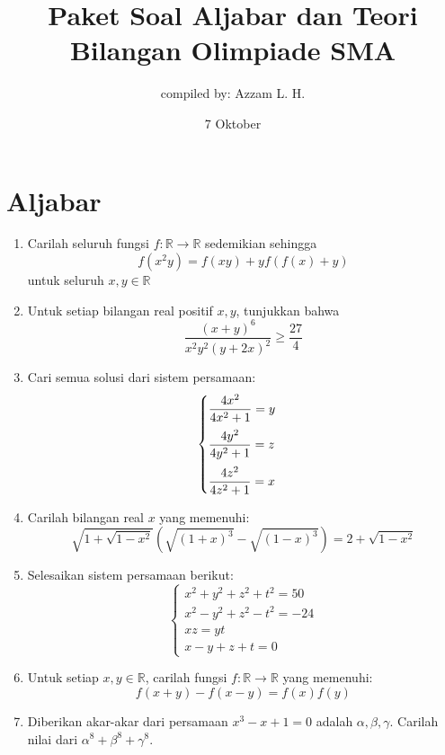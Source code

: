 \documentclass[12pt]{scrartcl}
\title{Paket Soal Aljabar dan Teori Bilangan Olimpiade SMA}
\author{compiled by: Azzam L. H.}
\date{7 Oktober}
\newcommand{\R}{\mathbb{R}}
\begin{document}
	
	\maketitle

\renewcommand*\contentsname{Daftar Isi}
\tableofcontents

\newpage
	
	\section{Aljabar}
	\begin{enumerate}
		\item
		Carilah seluruh fungsi $f:\R \rightarrow \R$ sedemikian sehingga
		\[
		f(x^2y)=f(xy)+yf(f(x)+y)
		\]
		untuk seluruh $x,y \in \R$
		
		\item
		Untuk setiap bilangan real positif $x,y$, tunjukkan bahwa $$\frac{(x+y)^6}{x^2y^2(y+2x)^2} \geq \frac{27}{4}$$
		
		\item
		Cari semua solusi dari sistem persamaan:
		$$
		\begin{cases}
			\vspace{2mm}
			\dfrac{4x^2}{4x^2+1}=y \\
			\vspace{2mm}
			\dfrac{4y^2}{4y^2+1}=z \\
			\dfrac{4z^2}{4z^2+1}=x
		\end{cases}
		$$
		
		\item
		Carilah bilangan real $x$ yang memenuhi:
		\[
		\sqrt{1+\sqrt{1-x^2}}\left(\sqrt{(1+x)^3}-\sqrt{(1-x)^3}\right)=2+\sqrt{1-x^2}
		\]
		
		\item
		Selesaikan sistem persamaan berikut:
		$$
		\begin{cases}
			x^2+y^2+z^2+t^2=50 \\
			x^2-y^2+z^2-t^2=-24 \\
			xz = yt \\
			x-y+z+t=0
		\end{cases}
		$$
		
		\item
		Untuk setiap $x,y \in \R$, carilah fungsi $f: \R \rightarrow  \R$ yang memenuhi:
		$$f(x+y)-f(x-y)=f(x)f(y)$$
		
		\item
		Diberikan akar-akar dari persamaan $x^3-x+1=0$ adalah $\alpha, \beta, \gamma$. Carilah nilai dari $\alpha^8+\beta^8+\gamma^8$.
		

\end{enumerate}
\end{document}
